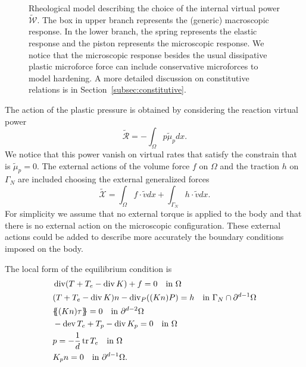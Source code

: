 \begin{figure}
\centering
{}
\caption{Rheological model describing the choice of the internal virtual power $\tilde{\mathcal W}$. The
box in upper branch represents the (generic) macroscopic response. In the lower branch,
the spring represents the elastic response and the piston represents the microscopic response. We
notice that the microscopic response besides the usual dissipative plastic microforce force can include conservative microforces to model hardening. A more detailed discussion on constitutive relations is in Section~\ref{subsec:constitutive}.}
\label{fig:rheological}
\end{figure}
The action of the plastic pressure is obtained by considering the reaction virtual power
\[
\tilde{\mathcal{R}}=-\int_\Omega p\tilde\mu_pdx.
\]
We notice that this power vanish on virtual rates that satisfy the constrain that is $\tilde\mu_p=0$. The external actions of the volume force $f$ on $\Omega$ and the traction $h$ on $\Gamma_N$ are included choosing the external generalized forces
\[
\tilde{\mathcal{X}}=\int_\Omega f\cdot\tilde vdx+\int_{\Gamma_N}h\cdot\tilde vdx.
\]
For simplicity we assume that no external torque is applied to the body and that there is no external action on the microscopic configuration. These external actions could be added to describe more accurately the boundary conditions imposed on the body.
\begin{lemma}
The local form of the equilibrium condition is
\begin{align*}
&\operatorname{div}(T+T_e-\operatorname{div} K)+f=0\quad\text{in $\Omega$} \\
&(T+T_e-\operatorname{div} K)n-\operatorname{div}_P((Kn)P)=h\quad\text{in $\Gamma_N\cap\partial^{d-1}\Omega$} \\
&\{\!\!\{(Kn)\tau\}\!\!\}=0\quad\text{in $\partial^{d-2}\Omega$} \\
&-\operatorname{dev} T_e+T_p-\operatorname{div} K_p=0\quad\text{in $\Omega$} \\
&p=-\frac{1}{d}\operatorname{tr} T_e\quad\text{in $\Omega$} \\
&K_p n=0\quad\text{in $\partial^{d-1}\Omega$}.
\end{align*}
\end{lemma}
